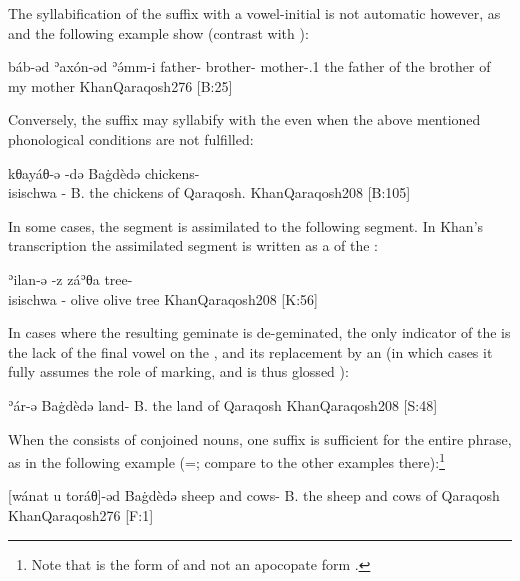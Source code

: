 The syllabification of the \cst* suffix with a vowel-initial \secn is not automatic however, as  and the following example show (contrast with ):

{báb-əd ʾaxón-əd ʾə́mm-i}
{father-\cst{} brother-\cst{} mother-\poss.1\sg{}}
{the father of the brother of my mother}
{KhanQaraqosh}{276 {[B:25]}}

Conversely, the suffix may syllabify with the \secn even when the above mentioned phonological conditions are not fulfilled:

{kθayáθ-ə -də\cb{} Baġdèdə}
{chickens-\\isi{schwa}{} -\cst\cb{} B.}
{the chickens of Qaraqosh.}
{KhanQaraqosh}{208 {[B:105]}}


In some cases, the  segment is assimilated to the following segment. In Khan's transcription the assimilated segment is written as a  of the \secn:







{ʾilan-ə -z\cb{} záʾθa}
{tree-\\isi{schwa}{} -\cst\cb{} olive}
{olive tree}
{KhanQaraqosh}{208 {[K:56]}}


In cases where the resulting geminate is de-geminated, the only indicator of the \cst* is the lack of the final \free* vowel on the \prim, and its replacement by an \phonetic[ə] (in which cases it fully assumes the role of \cst* marking, and is thus glossed \cst):


{ʾár-ə Baġdèdə}
{land-\cst{} B.}
{the land of Qaraqosh}
{KhanQaraqosh}{208 {[S:48]}}











When the \prim consists of conjoined nouns, one \cst* suffix is sufficient for the entire phrase, as in the following example (=; compare to the other examples there):\footnote{Note that   is the  \pl* form of  and not an apocopate form \citep[727]{KhanQaraqosh}.}



{[wánat\cb{} u toráθ]-əd Baġdèdə}
{sheep\cb{} and cows-\cst{} B.}
{the sheep and cows of Qaraqosh}
{KhanQaraqosh}{276 {[F:1]}}










